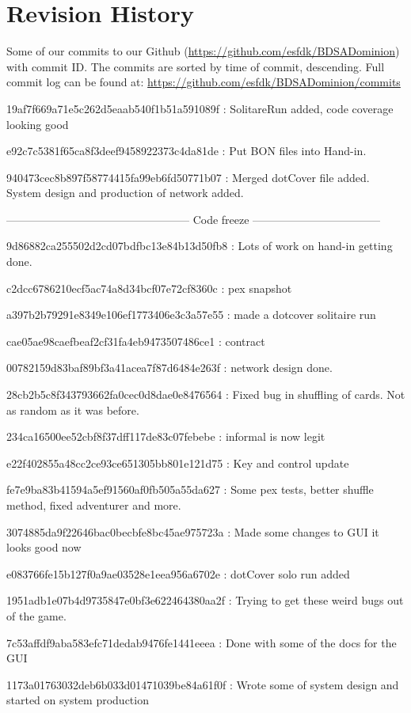 \section{Revision History}
Some of our commits to our Github (\url{https://github.com/esfdk/BDSADominion})  with commit ID. The commits are sorted by time of commit, descending. Full commit log can be found at: \url{https://github.com/esfdk/BDSADominion/commits}

19af7f669a71e5c262d5eaab540f1b51a591089f : SolitareRun added, code coverage looking good

e92c7c5381f65ca8f3deef9458922373c4da81de : Put BON files into Hand-in.

940473cec8b897f58774415fa99eb6fd50771b07 : Merged dotCover file added. System design and production of network added.

-------------------------------------------------- Code freeze -----------------------------------

9d86882ca255502d2cd07bdfbc13e84b13d50fb8 : Lots of work on hand-in getting done.

c2dcc6786210ecf5ac74a8d34bcf07e72cf8360c : pex snapshot

a397b2b79291e8349e106ef1773406e3c3a57e55 : made a dotcover solitaire run

cae05ae98caefbeaf2cf31fa4eb9473507486ce1 : contract

00782159d83baf89bf3a41acea7f87d6484e263f : network design done.

28cb2b5c8f343793662fa0cec0d8dae0e8476564 : Fixed bug in shuffling of cards. Not as random as it was before.

234ca16500ee52cbf8f37dff117de83c07febebe : informal is now legit

e22f402855a48cc2ce93ce651305bb801e121d75 : Key and control update

fe7e9ba83b41594a5ef91560af0fb505a55da627 : Some pex tests, better shuffle method, fixed adventurer and more.

3074885da9f22646bac0becbfe8bc45ae975723a : Made some changes to GUI it looks good now

e083766fe15b127f0a9ae03528e1eea956a6702e : dotCover solo run added

1951adb1e07b4d9735847e0bf3e622464380aa2f : Trying to get these weird bugs out of the game.

7c53affdf9aba583efc71dedab9476fe1441eeea : Done with some of the docs for the GUI

1173a01763032deb6b033d01471039be84a61f0f : Wrote some of system design and started on system production

